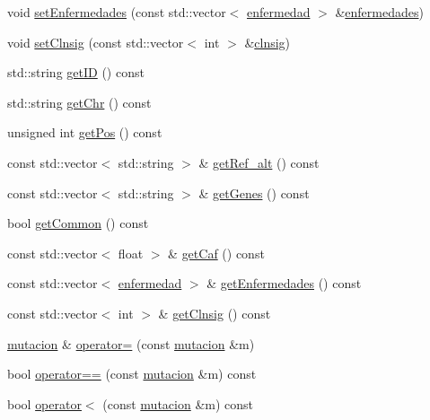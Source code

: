 \begin{DoxyCompactItemize}
\item 
void \hyperlink{classmutacion_a74da1d35cb0947b597ddf3b33e270d23}{set\+Enfermedades} (const std\+::vector$<$ \hyperlink{classenfermedad}{enfermedad} $>$ \&\hyperlink{classmutacion_ac8cca92dea1ab6fb9c193eed55a5ad28}{enfermedades})
\item 
void \hyperlink{classmutacion_aed8c1aedd3468bf27bafab931d576454}{set\+Clnsig} (const std\+::vector$<$ int $>$ \&\hyperlink{classmutacion_a0d029eee6925649df15081b780c12e37}{clnsig})
\item 
std\+::string \hyperlink{classmutacion_ab0be1896c2895c5ea2c369e19074c00d}{get\+ID} () const 
\item 
std\+::string \hyperlink{classmutacion_a402cb2c55b7d8b9ee195be08d9765fdc}{get\+Chr} () const 
\item 
unsigned int \hyperlink{classmutacion_ad08cb3c30da4195adc3c22d0b4c8edd7}{get\+Pos} () const 
\item 
const std\+::vector$<$ std\+::string $>$ \& \hyperlink{classmutacion_aa6ba4de2d653b7ee3d48561c33851082}{get\+Ref\+\_\+alt} () const 
\item 
const std\+::vector$<$ std\+::string $>$ \& \hyperlink{classmutacion_afb2cd45e5abde0e8d0d0555d2b2831b8}{get\+Genes} () const 
\item 
bool \hyperlink{classmutacion_abc353016535a561fbd8e902c83861228}{get\+Common} () const 
\item 
const std\+::vector$<$ float $>$ \& \hyperlink{classmutacion_a1eb523be88f47d1f4ef8324ca7016174}{get\+Caf} () const 
\item 
const std\+::vector$<$ \hyperlink{classenfermedad}{enfermedad} $>$ \& \hyperlink{classmutacion_aacfdae8cf04968fdc8fa803c8e5adb81}{get\+Enfermedades} () const 
\item 
const std\+::vector$<$ int $>$ \& \hyperlink{classmutacion_aa59e921d4a64cf1be5cd4d99076234ee}{get\+Clnsig} () const 
\item 
\hyperlink{classmutacion}{mutacion} \& \hyperlink{classmutacion_aa38c36e397000cbef22a5933f56d59ed}{operator=} (const \hyperlink{classmutacion}{mutacion} \&m)
\item 
bool \hyperlink{classmutacion_a2e36c20aeff8c7cc88abe84efe0b11be}{operator==} (const \hyperlink{classmutacion}{mutacion} \&m) const 
\item 
bool \hyperlink{classmutacion_a0ccb4444b7afd120dc4557fd05f9ca27}{operator$<$} (const \hyperlink{classmutacion}{mutacion} \&m) const 
\end{DoxyCompactItemize}
